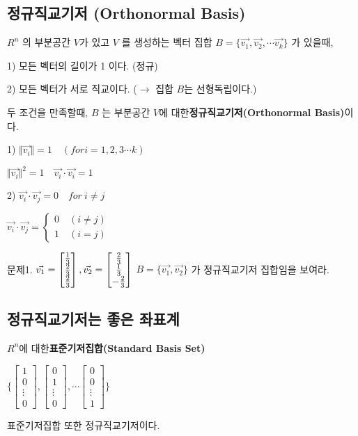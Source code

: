 \subsection{정규직교기저 (Orthonormal Basis)}
\begin{definition} 
$R^n$ 의 부분공간 $V$가 있고 $V$ 를 생성하는 벡터 집합 $B = \{ \vec{v_1}, \vec{v_2}, \cdots \vec{v_k} \}$ 가 있을때,

1) 모든 벡터의 길이가 1 이다. (정규)

2) 모든 벡터가 서로 직교이다. ($\rightarrow$ 집합 $B$는 선형독립이다.)

두 조건을 만족할때, $B$ 는 부분공간 $V$에 대한\textbf{정규직교기저(Orthonormal Basis)}이다.

1) $\Vert \vec{v_i} \Vert = 1 \quad (for i = 1,2,3 \cdots k)$

$\Vert \vec{v_i} \Vert^{2} = 1 \quad \vec{v_i} \cdot \vec{v_i} = 1$

2) $\vec{v_i} \cdot \vec{v_j} = 0 \quad for \ i \neq j$

$\vec{v_i} \cdot \vec{v_j} = \begin{cases} 0 \quad (i \neq j) \\ 1 \quad (i = j) \end{cases}$
\end{definition}

\newpage
문제1. $\vec{v_1} = \begin{bmatrix} {1 \over 3} \\ {2 \over 3} \\ {2 \over 3} \end{bmatrix}, \vec{v_2} = \begin{bmatrix} {2 \over 3} \\ {1 \over 3} \\ -{2 \over 3} \end{bmatrix}$ $B = \{ \vec{v_1}, \vec{v_2} \}$ 가 정규직교기저 집합임을 보여라.

\newpage
\subsection{정규직교기저는 좋은 좌표계}
\begin{definition} 
$R^n$에 대한\textbf{표준기저집합(Standard Basis Set)}

$\{ \begin{bmatrix} 1 \\ 0 \\ \vdots \\ 0 \end{bmatrix}, \begin{bmatrix} 0 \\ 1 \\ \vdots \\ 0 \end{bmatrix}, \cdots \begin{bmatrix} 0 \\ 0 \\ \vdots \\ 1 \end{bmatrix} \}$

표준기저집합 또한 정규직교기저이다.
\end{definition}



